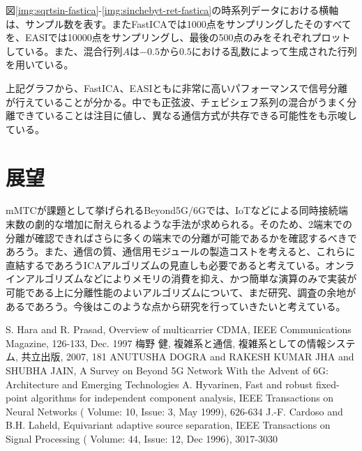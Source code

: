 \documentclass{jsarticle}
\begin{document}
図\ref{img:sqrtsin-fastica}-\ref{img:sinchebyt-ret-fastica}の時系列データにおける横軸は、サンプル数を表す。またFastICAでは1000点をサンプリングしたそのすべてを、EASIでは10000点をサンプリングし、最後の500点のみをそれぞれプロットしている。また、混合行列$A$は$-0.5$から$0.5$における乱数によって生成された行列を用いている。

上記グラフから、FastICA、EASIともに非常に高いパフォーマンスで信号分離が行えていることが分かる。中でも正弦波、チェビシェフ系列の混合がうまく分離できていることは注目に値し、異なる通信方式が共存できる可能性をも示唆している。

\section{展望}

mMTC\cite{mmtc}が課題として挙げられるBeyond5G/6Gでは、IoTなどによる同時接続端末数の劇的な増加に耐えられるような手法が求められる。そのため、2端末での分離が確認できればさらに多くの端末での分離が可能であるかを確認するべきであろう。また、通信の質、通信用モジュールの製造コストを考えると、これらに直結するであろうICAアルゴリズムの見直しも必要であると考えている。オンラインアルゴリズムなどによりメモリの消費を抑え、かつ簡単な演算のみで実装が可能である上に分離性能のよいアルゴリズムについて、まだ研究、調査の余地があるであろう。今後はこのような点から研究を行っていきたいと考えている。

\begin{thebibliography}{99}
     S. Hara and R. Prasad, Overview of multicarrier CDMA, IEEE Communications Magazine, 126-133, Dec. 1997
     梅野 健, 複雑系と通信, 複雑系としての情報システム,
    共立出版, 2007, 181
     ANUTUSHA DOGRA and RAKESH KUMAR JHA and SHUBHA JAIN, A Survey on Beyond 5G Network With the Advent of 6G: Architecture and Emerging Technologies
     A. Hyvarinen, Fast and robust fixed-point algorithms for independent component analysis, IEEE Transactions on Neural Networks ( Volume: 10, Issue: 3, May 1999), 626-634
     J.-F. Cardoso and B.H. Laheld, Equivariant adaptive source separation, IEEE Transactions on Signal Processing ( Volume: 44, Issue: 12, Dec 1996), 3017-3030
\end{thebibliography}
\end{document}
